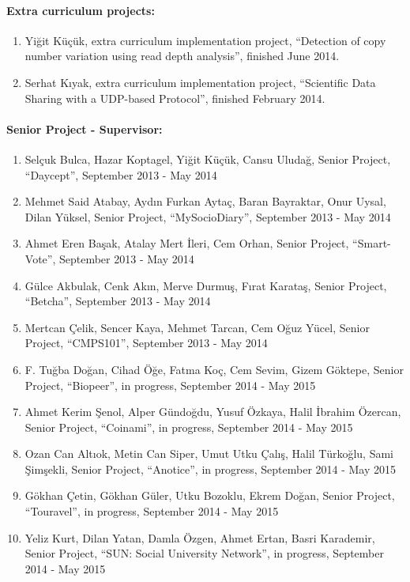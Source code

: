

\paragraph{Extra curriculum projects:}

\begin{enumerate}
\item Yiğit Küçük, extra curriculum implementation project, ``Detection of copy number variation using read depth analysis'', finished June 2014.
\item Serhat Kıyak, extra curriculum implementation project, ``Scientific Data Sharing with a UDP-based Protocol'', finished February 2014.
\end{enumerate}

\paragraph{Senior Project - Supervisor:}

\begin{enumerate} 
\item Selçuk Bulca, Hazar Koptagel, Yiğit Küçük, Cansu Uludağ, Senior Project, ``Daycept'',  September 2013 - May 2014 
\item Mehmet Said Atabay, Aydın Furkan Aytaç, Baran Bayraktar, Onur Uysal, Dilan Yüksel, Senior Project, ``MySocioDiary'', September 2013 - May 2014 
\item Ahmet Eren Başak, Atalay Mert İleri, Cem Orhan, Senior Project, ``Smart-Vote'', September 2013 - May 2014 
\item Gülce Akbulak, Cenk Akın, Merve Durmuş, Fırat Karataş, Senior Project, ``Betcha'', September 2013 - May 2014 
\item Mertcan Çelik, Sencer Kaya, Mehmet Tarcan, Cem Oğuz Yücel, Senior Project, ``CMPS101'',  September 2013 - May 2014 
\item F. Tuğba Doğan, Cihad Öğe, Fatma Koç, Cem Sevim, Gizem Göktepe, Senior Project, ``Biopeer'', in progress, September 2014 - May 2015
\item Ahmet Kerim Şenol, Alper Gündoğdu, Yusuf Özkaya, Halil İbrahim Özercan, Senior Project, ``Coinami'', in progress, September 2014 - May 2015
\item Ozan Can Altıok, Metin Can Siper, Umut Utku Çalış, Halil Türkoğlu, Sami Şimşekli, Senior Project, ``Anotice'', in progress, September 2014 - May 2015
\item Gökhan Çetin, Gökhan Güler, Utku Bozoklu, Ekrem Doğan, Senior Project, ``Touravel'', in progress, September 2014 - May 2015
\item Yeliz Kurt, Dilan Yatan, Damla Özgen, Ahmet Ertan, Basri Karademir, Senior Project, ``SUN: Social University Network'', in progress, September 2014 - May 2015
\end{enumerate}

